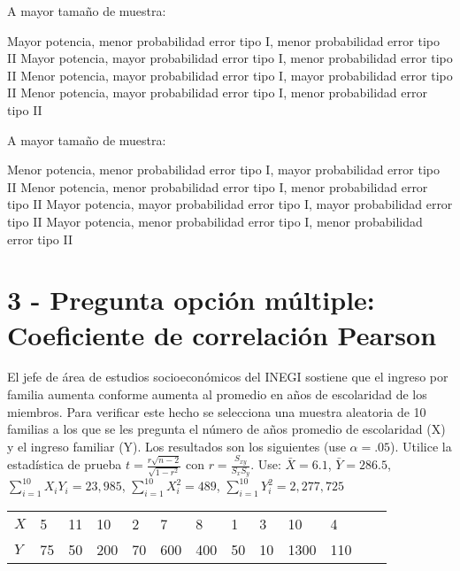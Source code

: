 \documentclass[addpoints]{exam}
\theoremstyle{mytheor}
\begin{document}
\begin{questions}
  \question A mayor tamaño de muestra:
    
    \begin{checkboxes}
  \choice Mayor potencia, menor probabilidad error tipo I, menor probabilidad error tipo II
  \choice Mayor potencia, mayor probabilidad error tipo I, menor probabilidad error tipo II
  \choice Menor potencia, mayor probabilidad error tipo I, mayor probabilidad error tipo II
  \choice Menor potencia, mayor probabilidad error tipo I, menor probabilidad error tipo II
  \end{checkboxes}
  
  
  \question A mayor tamaño de muestra:
    \begin{checkboxes}
  \choice Menor potencia, menor probabilidad error tipo I, mayor probabilidad error tipo II
  \choice Menor potencia, menor probabilidad error tipo I, menor probabilidad error tipo II
  \choice Mayor potencia, mayor probabilidad error tipo I, mayor probabilidad error tipo II
  \choice Mayor potencia, menor probabilidad error tipo I, menor probabilidad error tipo II
  \end{checkboxes}
  
  \newpage
  
  \section*{3 - Pregunta opción múltiple: Coeficiente de correlación Pearson}
  
  \question El jefe de área de estudios socioeconómicos del INEGI sostiene que el ingreso por familia aumenta conforme aumenta al promedio en años de escolaridad de los miembros. Para verificar este hecho se selecciona una muestra aleatoria de 10 familias a los que se les pregunta el número de años promedio de escolaridad (X) y el ingreso familiar (Y). Los resultados son los siguientes {(use $\alpha = .05$)}. Utilice la estadística de prueba $t = \frac{r \sqrt{n-2}}{\sqrt{1-r^2}}$ con $r = \frac{S_{xy}}{S_x S_y}$. Use: $\bar{X} = 6.1$,  $\bar{Y} = 286.5$, $\sum_{i=1}
  ^{10}{X_i Y_i} = 23,985$, $\sum_{i=1}^{10}{X_i^2} = 489$, $\sum_{i=1}^{10}{Y_i^2} =  2,277,725$ 
    
    \begin{table}[h]
  \centering
  \begin{tabular}{lllllllllllll} 
  $X$ & 5 & 11 & 10 & 2 & 7 & 8 & 1 & 3 & 10 & 4 \\
  $Y$ & 75 & 50 & 200 & 70 & 600 & 400 & 50 & 10 & 1300 & 110
  \end{tabular}
  \end{table}
  

\end{questions}
\end{document}
